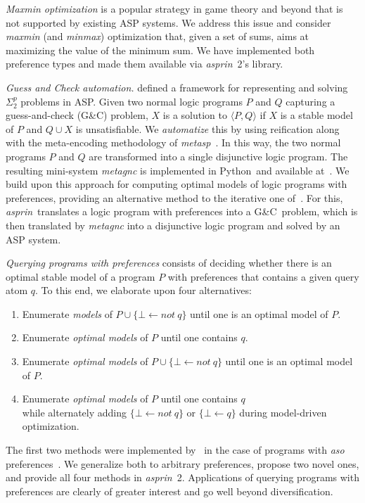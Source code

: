 \documentclass[a4paper,USenglish]{oasics-v2016}
\newcommand{\gc}[0]{G{\&}C}
\newcommand{\sysfont}{\textit}
\newcommand{\metasp}{\sysfont{metasp}}
\newcommand{\asprin}{\sysfont{asprin}}
\newcommand{\python}{Python}
\begin{document}
\emph{Maxmin optimization}
%
is a popular strategy in game theory and beyond that is not supported by existing ASP systems.
%
We address this issue and consider \emph{maxmin} (and \textit{minmax}) optimization that,
given a set of sums, aims at maximizing the value of the minimum sum.
%
We have implemented both preference types and made them available via \asprin~2's library.

\emph{Guess and Check automation.}
%
\cite{eitpol06a} defined a framework for representing and solving $\Sigma^p_2$ problems in ASP.
%
Given two normal logic programs $P$ and $Q$ capturing a guess-and-check (\gc) problem, 
%
$X$ is a solution to $\langle P,Q \rangle$ if $X$ is a stable model of $P$ and $Q \cup X$ is unsatisfiable.
%
We \emph{automatize} this by using reification along with the meta-encoding methodology of \metasp~\cite{gekasc11b}.
In this way, the two normal programs $P$ and $Q$ are transformed into a single disjunctive logic program.
The resulting mini-system \textit{metagnc} is implemented in \python\ and available at~\cite{asprin}.
%
We build upon this approach
for computing optimal models of logic programs with preferences, 
providing an alternative method to the iterative one of~\cite{brderosc15a}.
%
For this, 
\asprin\ translates a logic program with preferences into a \gc\ problem,
which is then translated by \textit{metagnc} into a disjunctive logic program
and solved by an ASP system.

\emph{Querying programs with preferences}
%
consists of 
deciding whether there is an optimal stable model of a program $P$ with preferences that contains a given query atom $q$.
%
To this end,
we elaborate upon four alternatives:%
\begin{enumerate}[label={\textcolor{darkgray}{\sffamily\bfseries\mathversion{bold}{Q-\arabic*}}}.]
\item Enumerate \emph{models} of $P \cup \{ \bot \leftarrow not \ q \}$ until one is an optimal model of $P$.
\item Enumerate \emph{optimal models} of $P$ until one contains $q$.
\item Enumerate \emph{optimal models} of $P \cup \{ \bot \leftarrow not \ q \}$ until one is an optimal model of $P$.
\item Enumerate \emph{optimal models} of $P$ until one contains $q$\\
  while alternately adding $\{ \bot \leftarrow not \ q \}$ or $\{ \bot \leftarrow q \}$ during model-driven optimization.
\end{enumerate}
%
The first two methods were implemented by~\cite{zhutru13a} in the case of programs with \emph{aso} preferences~\cite{brnitr03a}.
We generalize both to arbitrary preferences, propose two novel ones, and provide all four methods in \asprin~2.
%
Applications of querying programs with preferences are clearly of greater interest and go well beyond diversification.
\end{document}
